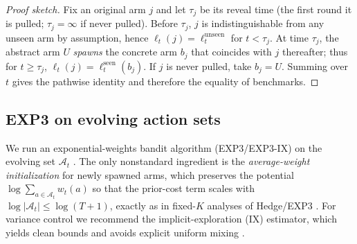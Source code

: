 \documentclass[10pt,twocolumn]{article}
\theoremstyle{definition}
\theoremstyle{remark}
\begin{document}
\begin{proof}[Proof sketch]
  Fix an original arm $j$ and let $\tau_j$ be its reveal time (the first round it is pulled; $\tau_j=\infty$ if never pulled). Before $\tau_j$, $j$ is indistinguishable from any unseen arm by assumption, hence $\ell_t(j)=\ell_t^{\mathrm{unseen}}$ for $t<\tau_j$. At time $\tau_j$, the abstract arm $U$ \emph{spawns} the concrete arm $b_j$ that coincides with $j$ thereafter; thus for $t\ge \tau_j$, $\ell_t(j)=\ell_t^{\mathrm{seen}}(b_j)$. If $j$ is never pulled, take $b_j=U$. Summing over $t$ gives the pathwise identity and therefore the equality of benchmarks.
\end{proof}

\subsection{EXP3 on evolving action sets}
We run an exponential-weights bandit algorithm (EXP3/EXP3-IX) on the evolving set $\mathcal{A}_t$ \citep{Auer2002Nonstochastic,BubeckCesaBianchi2012}. The only nonstandard ingredient is the \emph{average-weight initialization} for newly spawned arms, which preserves the potential $\log\!\sum_{a\in\mathcal{A}_t} w_t(a)$ so that the prior-cost term scales with $\log|\mathcal{A}_t|\le \log(T{+}1)$, exactly as in fixed-$K$ analyses of Hedge/EXP3 \citep{BubeckCesaBianchi2012}. For variance control we recommend the implicit-exploration (IX) estimator, which yields clean bounds and avoids explicit uniform mixing \citep{Neu2015IX,Kocak2014IX}.
\end{document}
